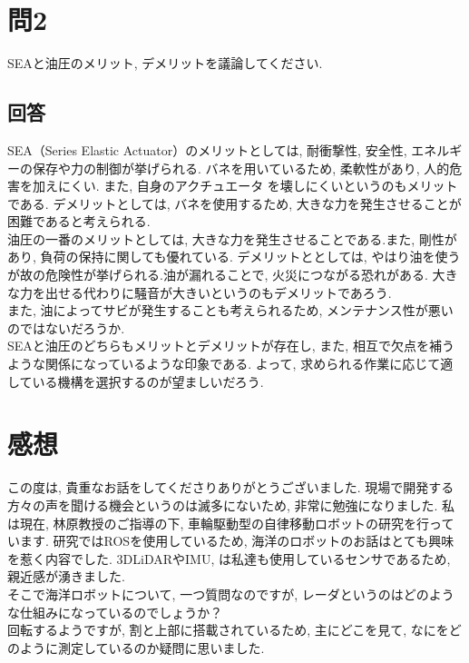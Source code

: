 \documentclass{jsarticle}
\begin{document}
\vspace*{10mm}

\section*{問2}
SEAと油圧のメリット, デメリットを議論してください.

\subsection*{回答}
SEA（Series Elastic Actuator）のメリットとしては, 耐衝撃性, 安全性, エネルギーの保存や力の制御が挙げられる.
\hspace*{1zw}バネを用いているため, 柔軟性があり, 人的危害を加えにくい. \hspace*{1zw}また, 自身のアクチュエータ
を壊しにくいというのもメリットである.
\hspace*{1zw}デメリットとしては, バネを使用するため, 大きな力を発生させることが困難であると考えられる.\\
\hspace*{1zw}油圧の一番のメリットとしては, 大きな力を発生させることである.\hspace*{1zw}また, 剛性があり, 負荷の保持に関しても優れている.
\hspace*{1zw}デメリットととしては, やはり油を使うが故の危険性が挙げられる.\hspace*{1zw}油が漏れることで, 火災につながる恐れがある.
\hspace*{1zw}大きな力を出せる代わりに騒音が大きいというのもデメリットであろう.\hspace*{1zw}\\また, 油によってサビが発生することも考えられるため, 
メンテナンス性が悪いのではないだろうか.\\
\hspace*{1zw}SEAと油圧のどちらもメリットとデメリットが存在し, また, 相互で欠点を補うような関係になっているような印象である.
\hspace*{1zw}よって, 求められる作業に応じて適している機構を選択するのが望ましいだろう.\\\vspace*{4mm}
\section*{感想}
この度は, 貴重なお話をしてくださりありがとうございました. \hspace*{1zw}現場で開発する方々の声を聞ける機会というのは滅多にないため, 
非常に勉強になりました. \hspace*{1zw}私は現在, 林原教授のご指導の下, 車輪駆動型の自律移動ロボットの研究を行っています.
研究ではROSを使用しているため, 海洋のロボットのお話はとても興味を惹く内容でした. 3DLiDARやIMU, は私達も使用しているセンサであるため, 親近感が湧きました.\\
\hspace*{1zw}そこで海洋ロボットについて, 一つ質問なのですが, レーダというのはどのような仕組みになっているのでしょうか？\\
\hspace*{1zw}回転するようですが, 割と上部に搭載されているため, 主にどこを見て, なにをどのように測定しているのか疑問に思いました.
\end{document}
